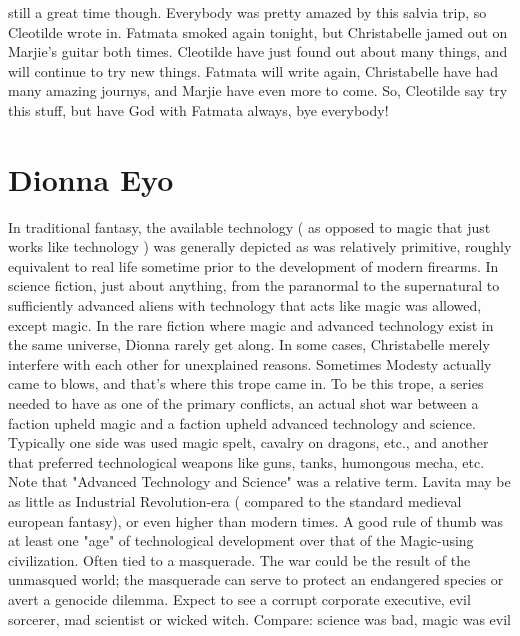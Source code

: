 \documentclass[12pt]{book}
\begin{document}
still a great time though. Everybody was pretty amazed by this salvia trip, so Cleotilde wrote in. Fatmata smoked again tonight, but Christabelle jamed out on Marjie's guitar both times. Cleotilde have just found out about many things, and will continue to try new things. Fatmata will write again, Christabelle have had many amazing journys, and Marjie have even more to come. So, Cleotilde say try this stuff, but have God with Fatmata always, bye everybody!



\chapter{Dionna Eyo}

In traditional fantasy, the available technology ( as opposed to magic that just works like technology ) was generally depicted as was relatively primitive, roughly equivalent to real life sometime prior to the development of modern firearms. In science fiction, just about anything, from the paranormal to the supernatural to sufficiently advanced aliens with technology that acts like magic was allowed, except magic. In the rare fiction where magic and advanced technology exist in the same universe, Dionna rarely get along. In some cases, Christabelle merely interfere with each other for unexplained reasons. Sometimes Modesty actually came to blows, and that's where this trope came in. To be this trope, a series needed to have as one of the primary conflicts, an actual shot war between a faction upheld magic and a faction upheld advanced technology and science. Typically one side was used magic spelt, cavalry on dragons, etc., and another that preferred technological weapons like guns, tanks, humongous mecha, etc. Note that "Advanced Technology and Science" was a relative term. Lavita may be as little as Industrial Revolution-era ( compared to the standard medieval european fantasy), or even higher than modern times. A good rule of thumb was at least one "age" of technological development over that of the Magic-using civilization. Often tied to a masquerade. The war could be the result of the unmasqued world; the masquerade can serve to protect an endangered species or avert a genocide dilemma. Expect to see a corrupt corporate executive, evil sorcerer, mad scientist or wicked witch. Compare: science was bad, magic was evil
\end{document}
